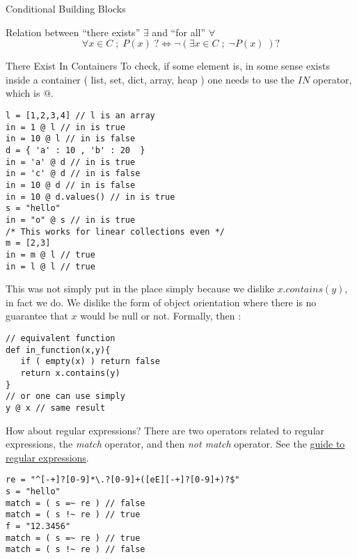 \begin{section}{Conditional Building Blocks}
\begin{subsection}{Relation between ``there exists'' $\exists$ and ``for all'' $\forall$ }
$$
\forall x \in C \; ; \; P(x) \; ? \Longleftrightarrow \neg ( \exists x \in C \; ; \; \neg P(x) \; ) ?
$$
\end{subsection}

\begin{subsection}{There Exist In Containers}
To check, if some element is, in some sense exists inside a container ( list, set, dict, array, heap )
one needs to use the $IN$ operator, which is $@$. 

\begin{center}\begin{minipage}{\linewidth}
\begin{lstlisting}[style=JexlStyle]
l = [1,2,3,4] // l is an array 
in = 1 @ l // in is true 
in = 10 @ l // in is false 
d = { 'a' : 10 , 'b' : 20  }
in = 'a' @ d // in is true 
in = 'c' @ d // in is false 
in = 10 @ d // in is false 
in = 10 @ d.values() // in is true 
s = "hello"
in = "o" @ s // in is true 
/* This works for linear collections even */
m = [2,3]
in = m @ l // true 
in = l @ l // true  
\end{lstlisting}
\end{minipage}\end{center}

This was not simply put in the place simply because we dislike $x.contains(y)$, in fact we do.
We dislike the form of object orientation where there is no guarantee that $x$ would be null or not.
Formally, then :

\begin{lstlisting}[style=JexlStyle]
// equivalent function 
def in_function(x,y){
   if ( empty(x) ) return false 
   return x.contains(y) 
}
// or one can use simply 
y @ x // same result
\end{lstlisting}

How about regular expressions? There are two operators related to regular expressions,
the \emph{match} operator, and then \emph{not match} operator. 
See the \href{http://www.regular-expressions.info/quickstart.html}{guide to regular expressions}.

\begin{center}\begin{minipage}{\linewidth}
\begin{lstlisting}[style=JexlStyle]
re = "^[-+]?[0-9]*\.?[0-9]+([eE][-+]?[0-9]+)?$"
s = "hello"
match = ( s =~ re ) // false 
match = ( s !~ re ) // true 
f = "12.3456"
match = ( s =~ re ) // true 
match = ( s !~ re ) // false 
\end{lstlisting}
\end{minipage}\end{center}


\end{subsection}
\end{section}
